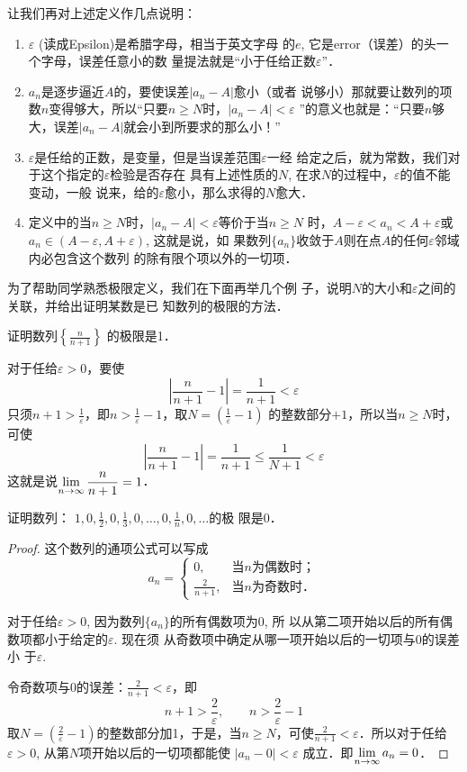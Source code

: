 让我们再对上述定义作几点说明：
\begin{enumerate}
\item $\varepsilon$ (读成Epsilon)是希腊字母，相当于英文字母
的$e$, 它是error（误差）的头一个字母，误差任意小的数
量提法就是“小于任给正数$\varepsilon$”．
\item $a_n$是逐步逼近$A$的，要使误差$|a_n-A|$愈小（或者
说够小）那就要让数列的项数$n$变得够大，所以“只要$n\ge
N$时，$|a_n-A|<\varepsilon$ ”的意义也就是：“只要$n$够大，误差$|a_n
-A|$就会小到所要求的那么小！”
\item $\varepsilon$是任给的正数，是变量，但是当误差范围$\varepsilon$一经
给定之后，就为常数，我们对于这个指定的$\varepsilon$检验是否存在
具有上述性质的$N$, 在求$N$的过程中，$\varepsilon$的值不能变动，一般
说来，给的$\varepsilon$愈小，那么求得的$N$愈大．
\item 定义中的当$n\ge N$时，$|a_n-A|<\varepsilon$等价于当$n\ge N$
时，$A-\varepsilon<a_n<A+\varepsilon$或$a_n\in (A-\varepsilon,A+\varepsilon)$, 这就是说，如
果数列$\{a_n\}$收敛于$A$则在点$A$的任何$\varepsilon$邻域内必包含这个数列
的除有限个项以外的一切项．
\end{enumerate}


为了帮助同学熟悉极限定义，我们在下面再举几个例
子，说明$N$的大小和$\varepsilon$之间的关联，并给出证明某数是已
知数列的极限的方法．

\begin{example}
    证明数列$\left\{\frac{n}{n+1}\right\}$
的极限是1．
\end{example}

\begin{solution}
对于任给$\varepsilon>0$，要使
\[\left|\frac{n}{n+1}-1\right|=\frac{1}{n+1}<\varepsilon\]
只须$n+1>\frac{1}{\varepsilon}$，即$n>\frac{1}{\varepsilon}-1$，取$N=\left(\frac{1}{\varepsilon}-1\right)$
的整数部分$+1$，所以当$n\ge N$时，可使
\[\left|\frac{n}{n+1}-1\right|=\frac{1}{n+1}\le \frac{1}{N+1}<\varepsilon\]
    这就是说$\displaystyle\lim_{n\to\infty}\dfrac{n}{n+1}=1$．
\end{solution}

\begin{example}
    证明数列：
$1,0,\frac{1}{2},0,\frac{1}{3},0,\ldots,0,\frac{1}{n},0,\ldots$的极
限是0．
\end{example}

\begin{proof}
  这个数列的通项公式可以写成
\[a_n=\begin{cases}
    0,& \text{当$n$为偶数时；}\\
   \frac{2}{n+1},& \text{当$n$为奇数时．}
\end{cases}\]

对于任给$\varepsilon>0$, 因为数列$\{a_n\}$的所有偶数项为0, 所
以从第二项开始以后的所有偶数项都小于给定的$\varepsilon$. 现在须
从奇数项中确定从哪一项开始以后的一切项与0的误差小
于$\varepsilon$. 

令奇数项与0的误差：$\frac{2}{n+1}<\varepsilon$，即
\[n+1>\frac{2}{\varepsilon},\qquad n>\frac{2}{\varepsilon}-1\]  
取$N=\left(\frac{2}{\varepsilon}-1\right)$的整数部分加1，于是，当$n\ge N$，可使$\frac{2}{n+1}<\varepsilon$．所以对于任给$\varepsilon>0$, 从第$N$项开始以后的一切项都能使
$|a_n-0|<\varepsilon$
成立．即$\displaystyle\lim_{n\to\infty}a_n=0$．
\end{proof}


